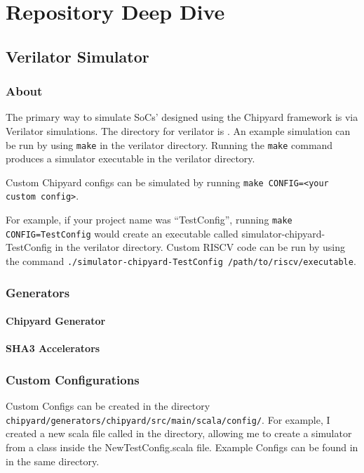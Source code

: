 \chapter{Repository Deep Dive}\label{chap:Repository_Deep_Dive}
\section{Verilator Simulator}\label{sec:Verilator_Simulator}
\subsection{About}\label{sec:About_Verilator_Simulator}
The primary way to simulate SoCs' designed using the Chipyard framework is via Verilator simulations.
The directory for verilator is .
An example simulation can be run by using \texttt{make} in the verilator directory.
Running the \texttt{make} command produces a simulator executable in the verilator directory.

Custom Chipyard configs can be simulated by running \texttt{make CONFIG=<your custom config>}.

For example, if your project name was ``TestConfig'', running \texttt{make CONFIG=TestConfig} would create an executable called simulator-chipyard-TestConfig in the verilator directory.
Custom RISCV code can be run by using the command \texttt{./simulator-chipyard-TestConfig /path/to/riscv/executable}.

\subsection{Generators}\label{sec:Generators}
\subsubsection{Chipyard Generator}\label{sec:Chipyard_Generator}
\subsubsection{SHA3 Accelerators}\label{sec:SHA3_Accelerators_Generator}

\subsection{Custom Configurations}\label{sec:Custom_Configurations}
Custom Configs can be created in the directory \texttt{chipyard/generators/chipyard/src/main/scala/config/}.
For example, I created a new scala file called  in the directory, allowing me to create a simulator from a class inside the NewTestConfig.scala file.
Example Configs can be found in   in the same directory.

